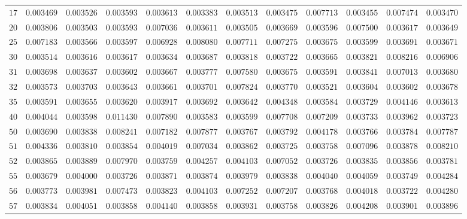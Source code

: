 \begin{sidewaystable}
\begin{tabular}{r|rrrrrrrrrrr}
$17$ & $0.003469$ & $0.003526$ & $0.003593$ & $0.003613$ & $0.003383$ & $0.003513$ & $0.003475$ & $0.007713$ & $0.003455$ & $0.007474$ & $0.003470$ \\
$20$ & $0.003806$ & $0.003503$ & $0.003593$ & $0.007036$ & $0.003611$ & $0.003505$ & $0.003669$ & $0.003596$ & $0.007500$ & $0.003617$ & $0.003649$ \\
$25$ & $0.007183$ & $0.003566$ & $0.003597$ & $0.006928$ & $0.008080$ & $0.007711$ & $0.007275$ & $0.003675$ & $0.003599$ & $0.003691$ & $0.003671$ \\
$30$ & $0.003514$ & $0.003616$ & $0.003617$ & $0.003634$ & $0.003687$ & $0.003818$ & $0.003722$ & $0.003665$ & $0.003821$ & $0.008216$ & $0.006906$ \\
$31$ & $0.003698$ & $0.003637$ & $0.003602$ & $0.003667$ & $0.003777$ & $0.007580$ & $0.003675$ & $0.003591$ & $0.003841$ & $0.007013$ & $0.003680$ \\
$32$ & $0.003573$ & $0.003703$ & $0.003643$ & $0.003661$ & $0.003701$ & $0.007824$ & $0.003770$ & $0.003521$ & $0.003604$ & $0.003602$ & $0.003678$ \\
$35$ & $0.003591$ & $0.003655$ & $0.003620$ & $0.003917$ & $0.003692$ & $0.003642$ & $0.004348$ & $0.003584$ & $0.003729$ & $0.004146$ & $0.003613$ \\
$40$ & $0.004044$ & $0.003598$ & $0.011430$ & $0.007890$ & $0.003583$ & $0.003599$ & $0.007708$ & $0.007209$ & $0.003733$ & $0.003962$ & $0.003723$ \\
$50$ & $0.003690$ & $0.003838$ & $0.008241$ & $0.007182$ & $0.007877$ & $0.003767$ & $0.003792$ & $0.004178$ & $0.003766$ & $0.003784$ & $0.007787$ \\
$51$ & $0.004336$ & $0.003810$ & $0.003854$ & $0.004019$ & $0.007034$ & $0.003862$ & $0.003725$ & $0.003758$ & $0.007096$ & $0.003878$ & $0.008210$ \\
$52$ & $0.003865$ & $0.003889$ & $0.007970$ & $0.003759$ & $0.004257$ & $0.004103$ & $0.007052$ & $0.003726$ & $0.003835$ & $0.003856$ & $0.003781$ \\
$55$ & $0.003679$ & $0.004000$ & $0.003726$ & $0.003871$ & $0.003874$ & $0.003979$ & $0.003838$ & $0.004040$ & $0.004059$ & $0.003749$ & $0.004284$ \\
$56$ & $0.003773$ & $0.003981$ & $0.007473$ & $0.003823$ & $0.004103$ & $0.007252$ & $0.007207$ & $0.003768$ & $0.004018$ & $0.003722$ & $0.004280$ \\
$57$ & $0.003834$ & $0.004051$ & $0.003858$ & $0.004140$ & $0.003858$ & $0.003931$ & $0.003758$ & $0.003826$ & $0.004208$ & $0.003901$ & $0.003896$ \\

\end{tabular}
\end{sidewaystable}
